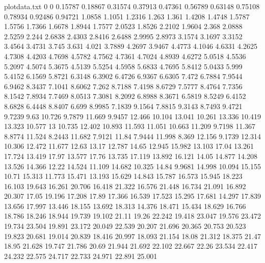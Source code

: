 %


\begin{filecontents*}{plotdata.txt}
0	0
0.15787	0.18867
0.31574	0.37913
0.47361	0.56789
0.63148	0.75108
0.78934	0.92486
0.94721	1.0858
1.1051	1.2316
1.263	1.361
1.4208	1.4748
1.5787	1.5756
1.7366	1.6678
1.8944	1.7577
2.0523	1.8526
2.2102	1.9604
2.368	2.0888
2.5259	2.244
2.6838	2.4303
2.8416	2.6488
2.9995	2.8973
3.1574	3.1697
3.3152	3.4564
3.4731	3.745
3.631	4.021
3.7889	4.2697
3.9467	4.4773
4.1046	4.6331
4.2625	4.7308
4.4203	4.7698
4.5782	4.7562
4.7361	4.7024
4.8939	4.6272
5.0518	4.5536
5.2097	4.5074
5.3675	4.5139
5.5254	4.5958
5.6833	4.7695
5.8412	5.0433
5.999	5.4152
6.1569	5.8721
6.3148	6.3902
6.4726	6.9367
6.6305	7.472
6.7884	7.9544
6.9462	8.3437
7.1041	8.6062
7.262	8.7188
7.4198	8.6729
7.5777	8.4764
7.7356	8.1542
7.8934	7.7469
8.0513	7.3081
8.2092	6.8988
8.3671	6.5819
8.5249	6.4152
8.6828	6.4448
8.8407	6.699
8.9985	7.1839
9.1564	7.8815
9.3143	8.7493
9.4721	9.7239
9.63	10.726
9.7879	11.669
9.9457	12.466
10.104	13.041
10.261	13.336
10.419	13.323
10.577	13
10.735	12.402
10.893	11.593
11.051	10.663
11.209	9.7198
11.367	8.8774
11.524	8.2443
11.682	7.9121
11.84	7.9444
11.998	8.369
12.156	9.1739
12.314	10.306
12.472	11.677
12.63	13.17
12.787	14.65
12.945	15.982
13.103	17.04
13.261	17.724
13.419	17.97
13.577	17.76
13.735	17.119
13.892	16.121
14.05	14.877
14.208	13.526
14.366	12.22
14.524	11.109
14.682	10.325
14.84	9.9681
14.998	10.094
15.155	10.71
15.313	11.773
15.471	13.193
15.629	14.843
15.787	16.573
15.945	18.223
16.103	19.643
16.261	20.706
16.418	21.322
16.576	21.448
16.734	21.091
16.892	20.307
17.05	19.196
17.208	17.89
17.366	16.539
17.523	15.295
17.681	14.297
17.839	13.656
17.997	13.446
18.155	13.692
18.313	14.376
18.471	15.434
18.629	16.766
18.786	18.246
18.944	19.739
19.102	21.11
19.26	22.242
19.418	23.047
19.576	23.472
19.734	23.504
19.891	23.172
20.049	22.539
20.207	21.696
20.365	20.753
20.523	19.823
20.681	19.014
20.839	18.416
20.997	18.093
21.154	18.08
21.312	18.375
21.47	18.95
21.628	19.747
21.786	20.69
21.944	21.692
22.102	22.667
22.26	23.534
22.417	24.232
22.575	24.717
22.733	24.971
22.891	25.001

\end{filecontents*}
